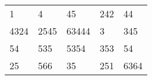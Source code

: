 \begin{table}[]
\begin{tabular}{lllll}
1    & 4    & 45    & 242 & 44   \\
4324 & 2545 & 63444 & 3   & 345  \\
54   & 535  & 5354  & 353 & 54   \\
25   & 566  & 35    & 251 & 6364
\end{tabular}
\label{tab:table4}
\end{table}